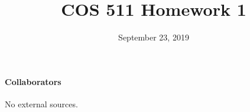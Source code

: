 \documentclass[12pt]{pset}
\title{COS 511 Homework 1}
\date{September 23, 2019}
\begin{document}
\maketitle

\pp\td

\closepp
\paragraph{Collaborators}
No external sources.
\td

% 

\end{document}
